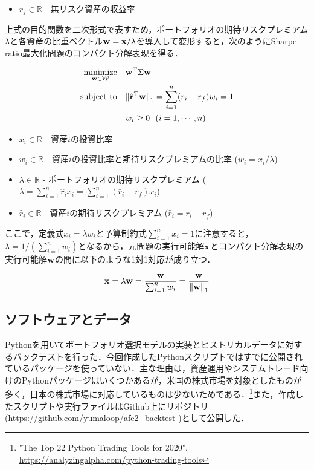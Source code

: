 \documentclass[dvipdfmx,autodetect-engine]{jsarticle}
\begin{document}
\begin{itemize}
    \item $r_f \in \mathbb{R}$ - 無リスク資産の収益率
\end{itemize}

上式の目的関数を二次形式で表すため，ポートフォリオの期待リスクプレミアム$\lambda$と各資産の比重ベクトル${\bf w} = {\bf x} / \lambda$を導入して変形すると，次のようにSharpe-ratio最大化問題のコンパクト分解表現を得る．

\begin{align}
    \underset{\bf w \in \mathcal{W}}{\rm minimize} ~~~ 
    & {\bf w}^{\mathrm{T}} \Sigma {\bf w} \\
    {\rm subject~to} ~~~ 
    &{\| \hat{\bf r}^{\mathrm{T}} {\bf w} \|}_{1} = \sum_{i=1}^{n} (\bar{r}_i - r_f) w_i = 1 \\
    &w_i \geq 0 ~~ (i = 1, \cdots, n)
\end{align}

\begin{itemize}
    \item $x_i \in \mathbb{R}$ - 資産$i$の投資比率
    \item $w_i \in \mathbb{R}$ - 資産$i$の投資比率と期待リスクプレミアムの比率 ($w_i = x_i / \lambda $)
    \item $\lambda \in \mathbb{R}$ - ポートフォリオの期待リスクプレミアム ($\lambda = \sum_{i=1}^{n} \hat{r}_i x_i = \sum_{i=1}^{n} (\bar{r}_i - r_f) x_i$)
    \item $\hat{r}_i \in \mathbb{R}$ - 資産$i$の期待リスクプレミアム ($\hat{r}_i = \bar{r}_i - r_f$)
\end{itemize}

ここで，定義式$x_i = \lambda w_i$と予算制約式$\sum_{i=1}^{n} x_i = 1$に注意すると，$\lambda = 1/(\sum_{i=1}^{n} w_i)$となるから，元問題の実行可能解$\bf x$とコンパクト分解表現の実行可能解$\bf w$の間に以下のような1対1対応が成り立つ．

\begin{align}
    {\bf x} = \lambda {\bf w} =  \frac{\bf w}{\sum_{i=1}^{n} w_i} = \frac{\bf w}{{\|{\bf w}\|}_1}
\end{align}


\subsection{ソフトウェアとデータ}

Pythonを用いてポートフォリオ選択モデルの実装とヒストリカルデータに対するバックテストを行った．今回作成したPythonスクリプトではすでに公開されているパッケージを使っていない．主な理由は，資産運用やシステムトレード向けのPythonパッケージはいくつかあるが，米国の株式市場を対象としたものが多く，日本の株式市場に対応しているものは少ないためである．\footnote{"The Top 22 Python Trading Tools for 2020", \url{https://analyzingalpha.com/python-trading-tools}}また，作成したスクリプトや実行ファイルはGithub上にリポジトリ(\url{https://github.com/yumaloop/afe2_backtest}
)として公開した．
\end{document}
